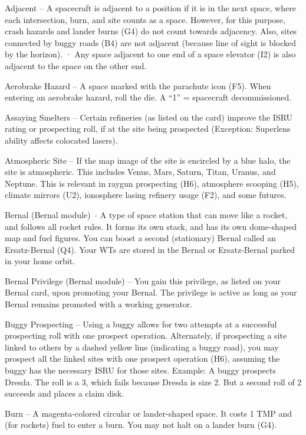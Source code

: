 \documentclass[a4paper]{book}
\begin{document}
Adjacent – A spacecraft is adjacent to a position if it is in the next space, where each intersection, burn, and site counts as a space. However, for this purpose, crash hazards and lander burns (G4) do not count towards adjacency. Also, sites connected by buggy roads (B4) are not adjacent (because line of sight is blocked by the horizon).
·   	Any space adjacent to one end of a space elevator (I2) is also adjacent to the space on the other end.

Aerobrake Hazard – A space marked with the parachute icon (F5). When entering an aerobrake hazard, roll the die. A “1” = spacecraft decommissioned.

Assaying Smelters – Certain refineries (as listed on the card) improve the ISRU rating or prospecting roll, if at the site being prospected (Exception: Superlens ability affects colocated lasers).

Atmospheric Site – If the map image of the site is encircled by a blue halo, the site is atmospheric. This includes Venus, Mars, Saturn, Titan, Uranus, and Neptune. This is relevant in raygun prospecting (H6), atmosphere scooping (H5), climate mirrors (U2), ionosphere lasing refinery usage (F2), and some futures.

Bernal (Bernal module) – A type of space station that can move like a rocket, and follows all rocket rules. It forms its own stack, and has its own dome-shaped map and fuel figures. You can boost a second (stationary) Bernal called an Ersatz-Bernal (Q4). Your WTs are stored in the Bernal or Ersatz-Bernal parked in your home orbit.

Bernal Privilege (Bernal module) – You gain this privilege, as listed on your Bernal card, upon promoting your Bernal. The privilege is active as long as your Bernal remains promoted with a working generator.

Buggy Prospecting – Using a buggy allows for two attempts at a successful prospecting roll with one prospect operation. Alternately, if prospecting a site linked to others by a dashed yellow line (indicating a buggy road), you may prospect all the linked sites with one prospect operation (H6), assuming the buggy has the necessary ISRU for those sites.
Example: A buggy prospects Dresda. The roll is a 3, which fails because Dresda is size 2. But a second roll of 2 succeeds and places a claim disk.

Burn – A magenta-colored circular or lander-shaped space. It costs 1 TMP and (for rockets) fuel to enter a burn. You may not halt on a lander burn (G4).
\end{document}
